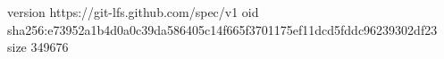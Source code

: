 version https://git-lfs.github.com/spec/v1
oid sha256:e73952a1b4d0a0c39da586405c14f665f3701175ef11dcd5fddc96239302df23
size 349676
